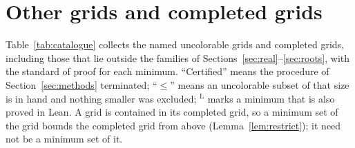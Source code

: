 \section{Other grids and completed grids}\label{sec:catalogue}

Table~\ref{tab:catalogue} collects the named uncolorable grids and completed grids, including those that lie outside
the families of Sections~\ref{sec:real}--\ref{sec:roots}, with the standard of proof for each
minimum.  ``Certified'' means the procedure of Section~\ref{sec:methods} terminated;
``$\le$'' means an uncolorable subset of that size is in hand and nothing smaller was excluded;
$^{\mathrm L}$ marks a minimum that is also proved in Lean.  A grid is contained in its
completed grid, so a minimum set of the grid bounds the completed grid from above
(Lemma~\ref{lem:restrict}); it need not be a minimum set of it.

